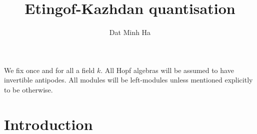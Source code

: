 

\setcounter{section}{-1}





    \title{Etingof-Kazhdan quantisation}
    
    \author{Dat Minh Ha}
    \maketitle
    
    \begin{abstract}
    
    \end{abstract}
    
    {
    \hypersetup{} 
    \tableofcontents %
    }

    \begin{convention}
        We fix once and for all a field $k$. All Hopf algebras will be assumed to have invertible antipodes. All modules will be left-modules unless mentioned explicitly to be otherwise.
    \end{convention}

    \section{Introduction}
    
    

    

    
    
    \printbibliography


